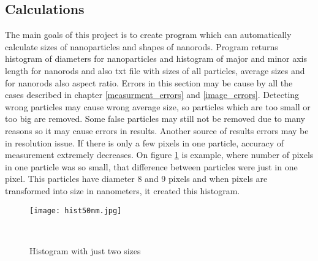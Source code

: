 \subsection{Calculations}

The main goals of this project is to create program which can automatically calculate sizes of nanoparticles and shapes of nanorods. Program returns histogram of diameters for nanoparticles and histogram of major and minor axis length for nanorods and also txt file with sizes of all particles, average sizes and for nanorods also aspect ratio. Errors in this section may be cause by all the cases described in chapter \ref{measurment_errors} and \ref{image_errors}. Detecting wrong particles may cause wrong average size, so particles which are too small or too big are removed. Some false particles may still not be removed due to many reasons so it may cause errors in results. Another source of results errors may be in resolution issue. If there is only a few pixels in one particle, accuracy of measurement extremely decreases. On figure \ref{fig:hist2} is example, where number of pixels in one particle was so small, that difference between particles were just in one pixel. This particles have diameter 8 and 9 pixels and when pixels are transformed into size in nanometers, it created this histogram.

\begin{figure}[h!]
\begin{center}
    \texttt{[image: hist50nm.jpg]}
    \caption{Histogram with just two sizes}~\label{fig:hist2}
\end{center}
\end{figure}